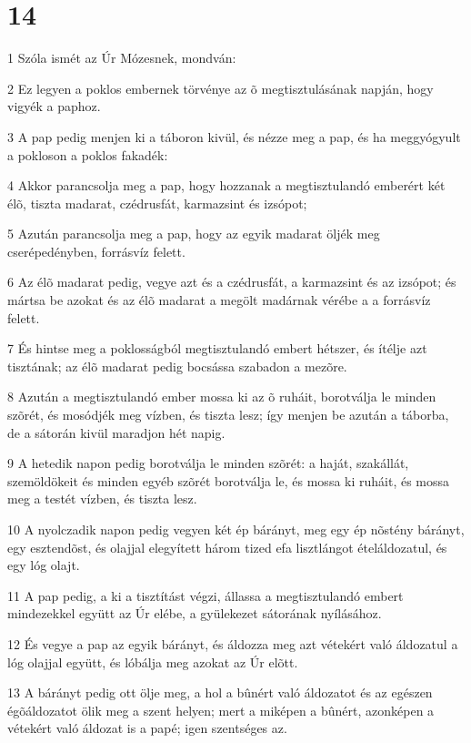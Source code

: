\chapter{14}

\par 1 Szóla ismét az Úr Mózesnek, mondván:
\par 2 Ez legyen a poklos embernek törvénye az õ megtisztulásának napján, hogy vigyék a paphoz.
\par 3 A pap pedig menjen ki a táboron kivül, és nézze meg a pap, és ha meggyógyult a pokloson a poklos fakadék:
\par 4 Akkor parancsolja meg a pap, hogy hozzanak a megtisztulandó emberért két élõ, tiszta madarat, czédrusfát, karmazsint és izsópot;
\par 5 Azután parancsolja meg a pap, hogy az egyik madarat öljék meg cserépedényben, forrásvíz felett.
\par 6 Az élõ madarat pedig, vegye azt és a czédrusfát, a karmazsint és az izsópot; és mártsa be azokat és az élõ madarat a megölt madárnak vérébe a a forrásvíz felett.
\par 7 És hintse meg a poklosságból megtisztulandó embert hétszer, és ítélje azt tisztának; az élõ madarat pedig bocsássa szabadon a mezõre.
\par 8 Azután a megtisztulandó ember mossa ki az õ ruháit, borotválja le minden szõrét, és mosódjék meg vízben, és tiszta lesz; így menjen be azután a táborba, de a sátorán kivül maradjon hét napig.
\par 9 A hetedik napon pedig borotválja le minden szõrét: a haját, szakállát, szemöldökeit és minden egyéb szõrét borotválja le, és mossa ki ruháit, és mossa meg a testét vízben, és tiszta lesz.
\par 10 A nyolczadik napon pedig vegyen két ép bárányt, meg egy ép nõstény bárányt, egy esztendõst, és olajjal elegyített három tized efa lisztlángot ételáldozatul, és egy lóg olajt.
\par 11 A pap pedig, a ki a tisztítást végzi, állassa a megtisztulandó embert mindezekkel együtt az Úr elébe, a gyülekezet sátorának nyílásához.
\par 12 És vegye a pap az egyik bárányt, és áldozza meg azt vétekért való áldozatul a lóg olajjal együtt, és lóbálja meg azokat az Úr elõtt.
\par 13 A bárányt pedig ott ölje meg, a hol a bûnért való áldozatot és az egészen égõáldozatot ölik meg a szent helyen; mert a miképen a bûnért, azonképen a vétekért való áldozat is a papé; igen szentséges az.
